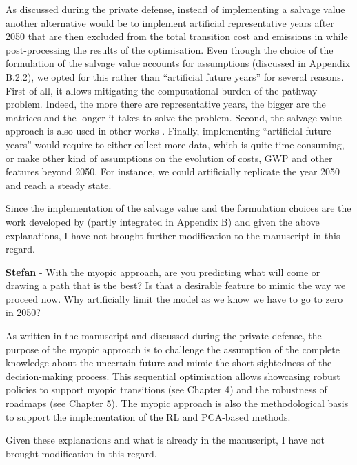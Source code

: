 \documentclass[12pt,a4paper]{article}
\begin{document}
As discussed during the private defense, instead of implementing a salvage value another alternative would be to implement artificial representative years after 2050 that are then excluded from the total transition cost and emissions in while post-processing the results of the optimisation. Even though the choice of the formulation of the salvage value accounts for assumptions (discussed in Appendix B.2.2), we opted for this rather than ``artificial future years'' for several reasons. First of all, it allows mitigating the computational burden of the pathway problem. Indeed, the more there are representative years, the bigger are the matrices and the longer it takes to solve the problem. Second, the salvage value-approach is also used in other works \cite{poncelet2016myopic,prina2019transition}. Finally, implementing ``artificial  future years'' would require to either collect more data, which is quite time-consuming, or make other kind of assumptions on the evolution of costs, GWP and other features beyond 2050. For instance, we could artificially replicate the year 2050 and reach a steady state.

Since the implementation of the salvage value and the formulation choices are the work developed by \citet{limpens2024pathway} (partly integrated in Appendix B) and given the above explanations, I have not brought further modification to the manuscript in this regard.

\begin{mdframed}[style=comment] %
{\color{teal} \textbf{Stefan}} - With the myopic approach, are you predicting what will come or drawing a path that is the best? Is that a desirable feature to mimic the way we proceed now. Why artificially limit the model as we know we have to go to zero in 2050?
\end{mdframed}

\noindent As written in the manuscript and discussed during the private defense, the purpose of the myopic approach is to challenge the assumption of the complete knowledge about the uncertain future and mimic the short-sightedness of the decision-making process. This sequential optimisation allows showcasing robust policies to support myopic transitions (see Chapter 4) and the robustness of roadmaps (see Chapter 5). The myopic approach is also the methodological basis to support the implementation of the RL and PCA-based methods. 

Given these explanations and what is already in the manuscript, I have not brought modification in this regard.
\end{document}
